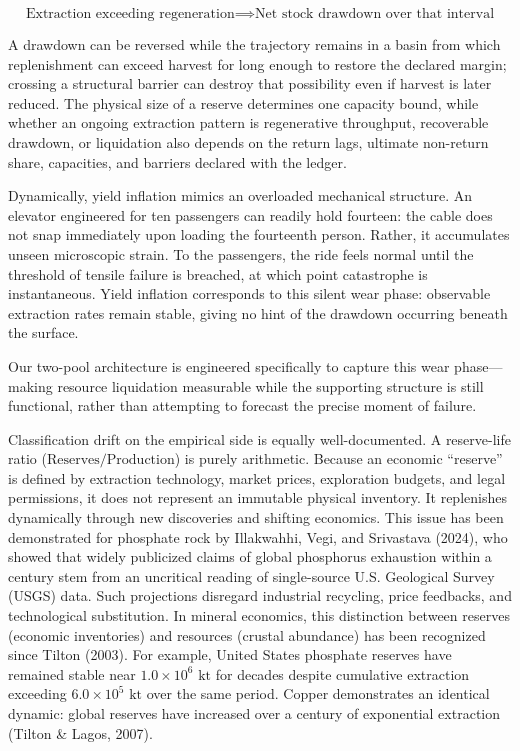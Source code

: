 \documentclass[11pt]{article}
\begin{document}
\[ \text{Extraction exceeding regeneration} \implies \text{Net stock drawdown over that interval} \]

A drawdown can be reversed while the trajectory remains in a basin from which replenishment can exceed harvest for long enough to restore the declared margin; crossing a structural barrier can destroy that possibility even if harvest is later reduced. The physical size of a reserve determines one capacity bound, while whether an ongoing extraction pattern is regenerative throughput, recoverable drawdown, or liquidation also depends on the return lags, ultimate non-return share, capacities, and barriers declared with the ledger.

Dynamically, yield inflation mimics an overloaded mechanical structure. An elevator engineered for ten passengers can readily hold fourteen: the cable does not snap immediately upon loading the fourteenth person. Rather, it accumulates unseen microscopic strain. To the passengers, the ride feels normal until the threshold of tensile failure is breached, at which point catastrophe is instantaneous. Yield inflation corresponds to this silent wear phase: observable extraction rates remain stable, giving no hint of the drawdown occurring beneath the surface.

Our two-pool architecture is engineered specifically to capture this wear phase---making resource liquidation measurable while the supporting structure is still functional, rather than attempting to forecast the precise moment of failure.

Classification drift on the empirical side is equally well-documented. A reserve-life ratio (\(\text{Reserves}/\text{Production}\)) is purely arithmetic. Because an economic ``reserve'' is defined by extraction technology, market prices, exploration budgets, and legal permissions, it does not represent an immutable physical inventory. It replenishes dynamically through new discoveries and shifting economics. This issue has been demonstrated for phosphate rock by Illakwahhi, Vegi, and Srivastava (2024), who showed that widely publicized claims of global phosphorus exhaustion within a century stem from an uncritical reading of single-source U.S. Geological Survey (USGS) data. Such projections disregard industrial recycling, price feedbacks, and technological substitution. In mineral economics, this distinction between reserves (economic inventories) and resources (crustal abundance) has been recognized since Tilton (2003). For example, United States phosphate reserves have remained stable near \(1.0\times 10^6\text{ kt}\) for decades despite cumulative extraction exceeding \(6.0\times 10^5\text{ kt}\) over the same period. Copper demonstrates an identical dynamic: global reserves have increased over a century of exponential extraction (Tilton \& Lagos, 2007).
\end{document}
